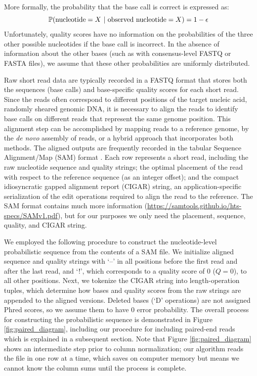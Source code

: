 \documentclass[12pt]{article}
\begin{document}
More formally, the probability that the base call is correct is expressed as: 
\begin{equation}
\label{eq:basecall}
\mathbb{P}(\text{nucleotide}=X \,\,|\,\, \text{observed nucleotide} = X) = 1 - \epsilon
\end{equation}
Unfortunately, quality scores have no information on the probabilities of the three other possible nucleotides if the base call is incorrect.
In the absence of information about the other bases (such as with consensus-level FASTQ or FASTA files), we assume that these other probabilities are uniformly distributed.


Raw short read data are typically recorded in a FASTQ format that stores both the sequences (base calls) and base-specific quality scores for each short read.
Since the reads often correspond to different positions of the target nucleic acid, \eg randomly sheared genomic DNA, it is necessary to align the reads to identify base calls on different reads that represent the same genome position.
This alignment step can be accomplished by mapping reads to a reference genome, by the \emph{de novo} assembly of reads, or a hybrid approach that incorporates both methods.
The aligned outputs are frequently recorded in the tabular Sequence Alignment/Map (SAM) format \cite{liSequenceAlignmentMap2009}.
Each row represents a short read, including the raw nucleotide sequence and quality strings; the optimal placement of the read with respect to the reference sequence (as an integer offset); and the compact idiosyncratic gapped alignment report (CIGAR) string, an application-specific serialization of the edit operations required to align the read to the reference.
The SAM format contains much more information (\url{https://samtools.github.io/hts-specs/SAMv1.pdf}), but for our purposes we only need the placement, sequence, quality, and CIGAR string.


We employed the following procedure to construct the nucleotide-level probabilistic sequence from the contents of a SAM file.
We initialize aligned sequence and quality strings with `--' in all positions before the first read and after the last read, and `!', which corresponds to a quality score of 0 ($Q=0$), to all other positions.
Next, we tokenize the CIGAR string into length-operation tuples, which determine how bases and quality scores from the raw strings are appended to the aligned versions.
Deleted bases (`D' operations) are not assigned Phred scores, so we assume them to have 0 error probability.
The overall process for constructing the probabilistic sequence is demonstrated in Figure \ref{fig:paired_diagram}, including our procedure for including paired-end reads which is explained in a subsequent section.
Note that Figure \ref{fig:paired_diagram} shows an intermediate step prior to column normalization; our algorithm reads the file in one row at a time, which saves on computer memory but means we cannot know the column sums until the process is complete.
\end{document}
